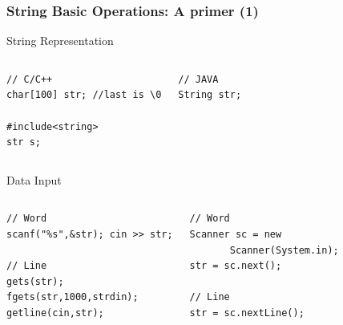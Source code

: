 \documentclass{beamer}
\begin{document}
\begin{frame}
  \frametitle{String Basic Operations: A primer (1)}
  {\smaller
    \begin{block}{String Representation}
      \begin{columns}[T]
\begin{verbatim}
// C/C++
char[100] str; //last is \0

#include<string> 
str s;
\end{verbatim}
\begin{verbatim}
// JAVA
String str;
\end{verbatim}
      \end{columns}
    \end{block}
    \begin{block}{Data Input}
      \begin{columns}[T]
\begin{verbatim}
// Word
scanf("%s",&str); cin >> str;

// Line
gets(str); 
fgets(str,1000,strdin);
getline(cin,str);
\end{verbatim}
\begin{verbatim}
// Word
Scanner sc = new 
       Scanner(System.in);
str = sc.next();

// Line
str = sc.nextLine();
\end{verbatim}
      \end{columns}
    \end{block}
  }
\end{frame}
\end{document}
